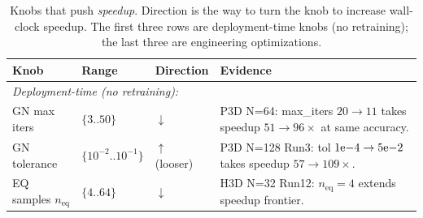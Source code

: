 \documentclass{article}
\begin{document}
  \begin{table}[!htbp]                             
  \centering                                                                                               
  \caption{Knobs that push \emph{speedup}. Direction is the way to turn
  the knob to increase wall-clock speedup. The first three rows are
  deployment-time knobs (no retraining); the last three are engineering                                    
  optimizations.}
  \label{tab:t2b}                                                                                          
  \small                                              
  \setlength{\tabcolsep}{4pt}                                                                              
  \begin{tabular}{p{3.0cm}p{2.4cm}p{1.4cm}p{5.5cm}}
  \toprule                                                                                                 
  Knob & Range & Direction & Evidence \\                                                                   
  \midrule                                     
  \multicolumn{4}{l}{\emph{Deployment-time (no retraining):}} \\                                           
  GN max iters           & $\{3..50\}$        & $\downarrow$                                               
    & P3D N=64: max\_iters $20 \to 11$ takes speedup $51 \to 96\times$ at same accuracy. \\                
  GN tolerance           & $\{10^{-2}..10^{-1}\}$ & $\uparrow$ (looser)                                    
    & P3D N=128 Run3: tol $1{\rm e}{-4} \to 5{\rm e}{-2}$ takes speedup $57 \to 109\times$. \\             
  EQ samples $n_\mathrm{eq}$ & $\{4..64\}$    & $\downarrow$                                               
    & H3D N=32 Run12: $n_\mathrm{eq}=4$ extends speedup frontier. \\                                       
  \bottomrule                                                                                              
  \end{tabular}                                                                                            
  \end{table}                                                                                              
                                                                                                           
\end{document}
